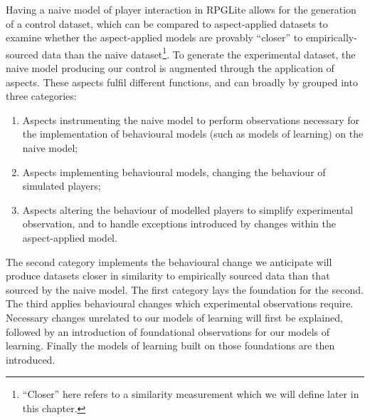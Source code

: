 

Having a naive model of player interaction in RPGLite allows for the generation
of a control dataset, which can be compared to aspect-applied datasets to
examine whether the aspect-applied models are provably ``closer'' to
empirically-sourced data than the naive dataset\footnote{``Closer'' here refers
to a similarity measurement which we will define later in this chapter.}. To
generate the experimental dataset, the naive model producing our control is
augmented through the application of aspects. These aspects fulfil different
functions, and can broadly by grouped into three categories:

\begin{enumerate}
  \item Aspects instrumenting the naive model to perform observations necessary
  for the implementation of behavioural models (such as models of learning) on
  the naive model;
  \item Aspects implementing behavioural models, changing the behaviour of
  simulated players;
  \item Aspects altering the behaviour of modelled players to simplify
  experimental observation, and to handle exceptions introduced by changes
  within the aspect-applied model.
\end{enumerate}

The second category implements the behavioural change we anticipate will produce
datasets closer in similarity to empirically sourced data than that sourced by
the naive model. The first category lays the foundation for the second. The
third applies behavioural changes which experimental observations require.
Necessary changes unrelated to our models of learning will first be explained,
followed by an introduction of foundational observations for our models of
learning. Finally the models of learning built on those foundations are then
introduced.

